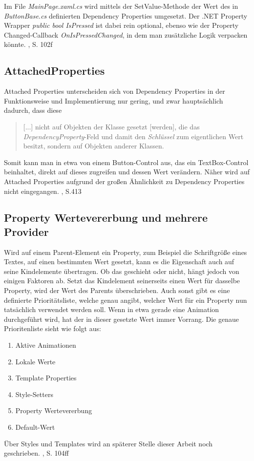 \documentclass[a4paper,bibtotoc,oneside]{scrbook}
\begin{document}
Im File \textit{MainPage.xaml.cs} wird mittels der SetValue-Methode der Wert des in \textit{ButtonBase.cs} definierten Dependency Properties umgesetzt.
\newline
Der .NET Property Wrapper \textit{public bool IsPressed} ist dabei rein optional, ebenso wie der Property Changed-Callback \textit{OnIsPressedChanged}, in dem man zusätzliche Logik verpacken könnte. \cite{ana12}, S. 102f

\subsection[Attached Properties]{AttachedProperties}
Attached Properties unterscheiden sich von Dependency Properties in der Funktionsweise und Implementierung nur gering, und zwar hauptsächlich dadurch, dass diese \begin{quote}[...] nicht auf Objekten der Klasse gesetzt [werden], die das \textit{DependencyProperty}-Feld und damit den \textit{Schlüssel} zum eigentlichen Wert besitzt, sondern auf Objekten anderer Klassen.\end{quote}
Somit kann man in etwa von einem Button-Control aus, das ein TextBox-Control beinhaltet, direkt auf dieses zugreifen und dessen Wert verändern. Näher wird auf Attached Properties aufgrund der großen Ähnlichkeit zu Dependency Properties nicht eingegangen. \cite{wpf10}, S.413

\subsection[Property Wertevererbung und mehrere Provider]{Property Wertevererbung und mehrere Provider}
Wird auf einem Parent-Element ein Property, zum Beispiel die Schriftgröße eines Textes, auf einen bestimmten Wert gesetzt, kann es die Eigenschaft auch auf seine Kindelemente übertragen. Ob das geschieht oder nicht, hängt jedoch von einigen 
Faktoren ab. Setzt das Kindelement seinerseits einen Wert für dasselbe Property, wird der Wert des Parents überschrieben. 
\newline
\newline
Auch sonst gibt es eine definierte Prioritätsliste, welche genau angibt, welcher Wert für ein Property nun tatsächlich verwendet werden soll. Wenn in etwa gerade eine Animation durchgeführt wird, hat der in dieser gesetzte Wert immer Vorrang. Die genaue Prioritenliste sieht wie folgt aus:
\begin{enumerate}
\item Aktive Animationen
\item Lokale Werte
\item Template Properties
\item Style-Setters
\item Property Wertevererbung
\item Default-Wert
\end{enumerate}
Über Styles und Templates wird an späterer Stelle dieser Arbeit noch geschrieben.
\cite{ana12}, S. 104ff
\end{document}
